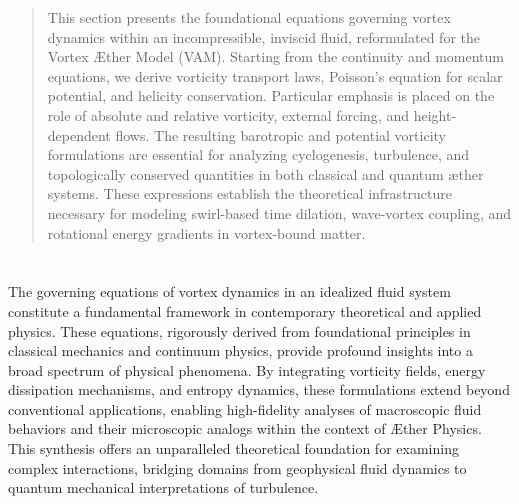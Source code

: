 \documentclass[12pt]{article}
\begin{document}
    \titlepageOpen

    \begin{abstract}
        This section presents the foundational equations governing vortex dynamics within an incompressible, inviscid fluid, reformulated for the Vortex Æther Model (VAM). Starting from the continuity and momentum equations, we derive vorticity transport laws, Poisson’s equation for scalar potential, and helicity conservation. Particular emphasis is placed on the role of absolute and relative vorticity, external forcing, and height-dependent flows. The resulting barotropic and potential vorticity formulations are essential for analyzing cyclogenesis, turbulence, and topologically conserved quantities in both classical and quantum æther systems. These expressions establish the theoretical infrastructure necessary for modeling swirl-based time dilation, wave-vortex coupling, and rotational energy gradients in vortex-bound matter.
    \end{abstract}

    \titlepageClose
    \fi

    \section{\papertitle}

    The governing equations of vortex dynamics in an idealized fluid system constitute a fundamental framework in contemporary theoretical and applied physics. These equations, rigorously derived from foundational principles in classical mechanics and continuum physics, provide profound insights into a broad spectrum of physical phenomena. By integrating vorticity fields, energy dissipation mechanisms, and entropy dynamics, these formulations extend beyond conventional applications, enabling high-fidelity analyses of macroscopic fluid behaviors and their microscopic analogs within the context of Æther Physics. This synthesis offers an unparalleled theoretical foundation for examining complex interactions, bridging domains from geophysical fluid dynamics to quantum mechanical interpretations of turbulence.
\end{document}
